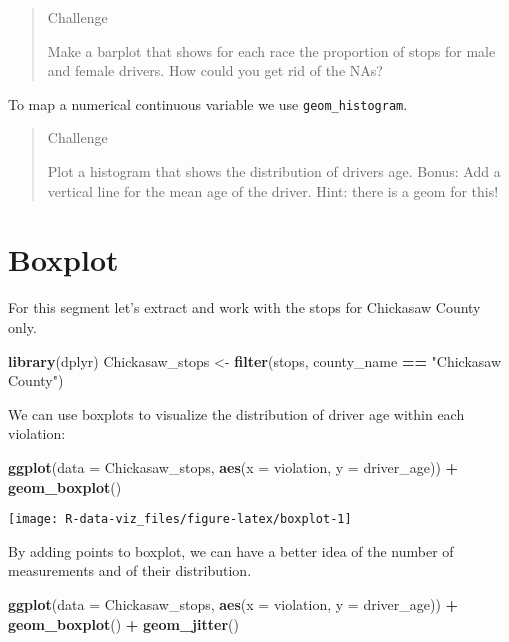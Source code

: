 \documentclass[]{book}
\newenvironment{Shaded}{\begin{snugshade}}{\end{snugshade}}
\newcommand{\DataTypeTok}[1]{\textcolor[rgb]{0.13,0.29,0.53}{#1}}
\newcommand{\KeywordTok}[1]{\textcolor[rgb]{0.13,0.29,0.53}{\textbf{#1}}}
\newcommand{\NormalTok}[1]{#1}
\newcommand{\OperatorTok}[1]{\textcolor[rgb]{0.81,0.36,0.00}{\textbf{#1}}}
\newcommand{\StringTok}[1]{\textcolor[rgb]{0.31,0.60,0.02}{#1}}
\begin{document}
\begin{quote}
Challenge

Make a barplot that shows for each race the proportion of stops for male and female drivers. How could you get rid of the NAs?
\end{quote}

To map a numerical continuous variable we use \texttt{geom\_histogram}.

\begin{quote}
Challenge

Plot a histogram that shows the distribution of drivers age.
Bonus: Add a vertical line for the mean age of the driver. Hint: there is a geom for this!
\end{quote}

\hypertarget{boxplot}{%
\section{Boxplot}\label{boxplot}}

For this segment let's extract and work with the stops for Chickasaw County only.

\begin{Shaded}
\begin{Highlighting}[]
\KeywordTok{library}\NormalTok{(dplyr)}
\NormalTok{Chickasaw_stops <-}\StringTok{ }\KeywordTok{filter}\NormalTok{(stops, county_name }\OperatorTok{==}\StringTok{ "Chickasaw County"}\NormalTok{)}
\end{Highlighting}
\end{Shaded}

We can use boxplots to visualize the distribution of driver age within each violation:

\begin{Shaded}
\begin{Highlighting}[]
\KeywordTok{ggplot}\NormalTok{(}\DataTypeTok{data =}\NormalTok{ Chickasaw_stops, }\KeywordTok{aes}\NormalTok{(}\DataTypeTok{x =}\NormalTok{ violation, }\DataTypeTok{y =}\NormalTok{ driver_age)) }\OperatorTok{+}
\StringTok{    }\KeywordTok{geom_boxplot}\NormalTok{()}
\end{Highlighting}
\end{Shaded}

\texttt{[image: R-data-viz\_files/figure-latex/boxplot-1]}

By adding points to boxplot, we can have a better idea of the number of
measurements and of their distribution.

\begin{Shaded}
\begin{Highlighting}[]
\KeywordTok{ggplot}\NormalTok{(}\DataTypeTok{data =}\NormalTok{ Chickasaw_stops, }\KeywordTok{aes}\NormalTok{(}\DataTypeTok{x =}\NormalTok{ violation, }\DataTypeTok{y =}\NormalTok{ driver_age)) }\OperatorTok{+}
\StringTok{    }\KeywordTok{geom_boxplot}\NormalTok{() }\OperatorTok{+}
\StringTok{    }\KeywordTok{geom_jitter}\NormalTok{()}
\end{Highlighting}
\end{Shaded}
\end{document}
